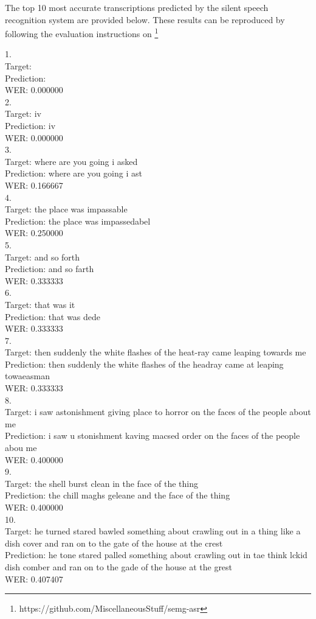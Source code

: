 The top 10 most accurate transcriptions predicted by the silent speech recognition
system are provided below. These results can be reproduced by following
the evaluation instructions on
\footnote{https://github.com/MiscellaneousStuff/semg-asr}

1.\\
 Target:     \\
 Prediction: \\
 WER: 0.000000\\
2.\\
 Target:     iv\\
 Prediction: iv\\
 WER: 0.000000\\
3.\\
 Target:     where are you going i asked\\
 Prediction: where are you going i ast\\
 WER: 0.166667\\
4.\\
 Target:     the place was impassable\\
 Prediction: the place was impassedabel\\
 WER: 0.250000\\
5.\\
 Target:     and so forth\\
 Prediction: and so farth\\
 WER: 0.333333\\
6.\\
 Target:     that was it\\
 Prediction: that was dede\\
 WER: 0.333333\\
7.\\
 Target:     then suddenly the white flashes of the heat-ray came leaping towards me\\
 Prediction: then suddenly the white flashes of the headray came at leaping towaeasman\\
 WER: 0.333333\\
8.\\
 Target:     i saw astonishment giving place to horror on the faces of the people about me\\
 Prediction: i saw u stonishment kaving macsed order on the faces of the people abou me\\
 WER: 0.400000\\
9.\\
 Target:     the shell burst clean in the face of the thing\\
 Prediction: the chill maghs geleane and the face of the thing\\
 WER: 0.400000\\
10.\\
 Target:     he turned stared bawled something about crawling out in a thing like a dish cover and ran on to the gate of the house at the crest\\
 Prediction: he tone stared palled something about crawling out in tae think lckid dish comber and ran on to the gade of the house at the grest\\
 WER: 0.407407